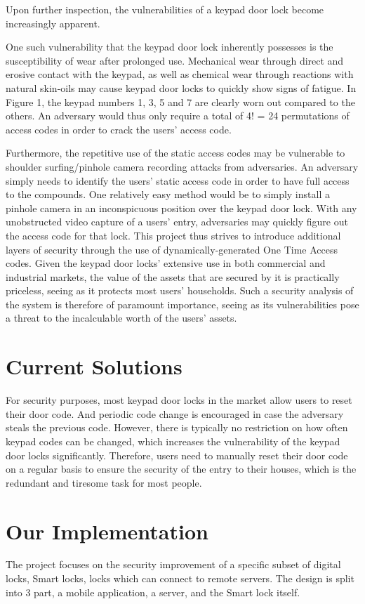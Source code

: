 \documentclass[conference]{IEEEtran}
\begin{document}
Upon further inspection, the vulnerabilities of a keypad door lock become increasingly apparent. 

One such vulnerability that the keypad door lock inherently possesses is  the susceptibility of wear after prolonged use. Mechanical wear through direct and erosive contact with the keypad, as well as chemical wear through reactions with natural skin-oils may cause keypad door locks to quickly show signs of fatigue. In Figure 1, the keypad numbers 1, 3, 5 and 7 are clearly worn out compared to the others. An adversary would thus only require a total of 4! = 24 permutations of access codes in order to crack the users’ access code.

Furthermore, the repetitive use of the static access codes may be vulnerable to shoulder surfing/pinhole camera recording attacks from adversaries. An adversary simply needs to identify the users’ static access code in order to have full access to the compounds. One relatively easy method would be to simply install a pinhole camera in an inconspicuous position over the keypad door lock. With any unobstructed video capture of a users’ entry, adversaries may quickly figure out the access code for that lock.
This project thus strives to introduce additional layers of security through the use of dynamically-generated One Time Access codes. Given the keypad door locks’ extensive use in both commercial and industrial markets, the value of the assets that are secured by it is practically priceless, seeing as it protects most users’ households. Such a security analysis of the system is therefore of paramount importance, seeing as its vulnerabilities pose a threat to the incalculable worth of the users’ assets. 

\section{Current Solutions}
For security purposes, most keypad door locks in the market allow users to reset their door code. And periodic code change is encouraged in case the adversary steals the previous code. However, there is typically no restriction on how often keypad codes can be changed, which increases the vulnerability of the keypad door locks significantly.
Therefore, users need to manually reset their door code on a regular basis to ensure the security of the entry to their houses, which is the redundant and tiresome task for most people.

\section{Our Implementation}
The project focuses on the security improvement of a specific subset of digital locks, Smart locks, locks which can connect to remote servers. The design is split into 3 part, a mobile application, a server, and the Smart lock itself.
\end{document}
